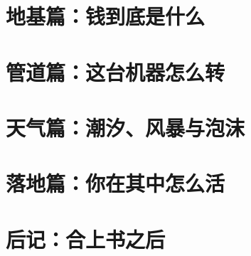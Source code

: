 \documentclass[
  lang=cn,
  scheme=chinese,
  color=blue,
  chinesefont=nofont,
  mode=fancy,
  math=newtx,
  device=normal,
  toc=onecol,
  11pt,
  a4paper,
]{elegantbook}
\begin{document}
\frontmatter
\pagestyle{empty}




\pagestyle{bookmain}
\tableofcontents
\clearpage



\mainmatter
\pagestyle{bookmain}

\part{地基篇：钱到底是什么}
\begingroup
\let\ELEGANTchapterA\chapter
\renewcommand{\chapter}[1]{%
  \ELEGANTchapterA*{#1}%
  \addcontentsline{toc}{chapter}{#1}%
  \markboth{#1}{#1}}

\endgroup







\part{管道篇：这台机器怎么转}







\part{天气篇：潮汐、风暴与泡沫}







\part{落地篇：你在其中怎么活}








\part{后记：合上书之后}
\begingroup
\let\ELEGANTchapter\chapter
\renewcommand{\chapter}[1]{%
  \ELEGANTchapter*{#1}%
  \addcontentsline{toc}{chapter}{#1}%
  \markboth{#1}{#1}}



\endgroup
\end{document}

